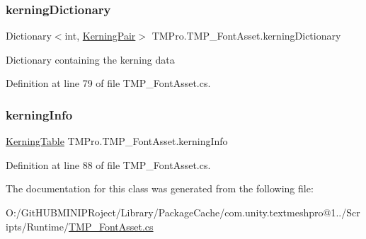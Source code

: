 \subsubsection{\texorpdfstring{kerningDictionary}{kerningDictionary}}
{\footnotesize\ttfamily Dictionary$<$int, \mbox{\hyperlink{class_t_m_pro_1_1_kerning_pair}{Kerning\+Pair}}$>$ T\+M\+Pro.\+T\+M\+P\+\_\+\+Font\+Asset.\+kerning\+Dictionary\hspace{0.3cm}{\ttfamily [get]}}



Dictionary containing the kerning data 



Definition at line 79 of file T\+M\+P\+\_\+\+Font\+Asset.\+cs.

\mbox{\label{class_t_m_pro_1_1_t_m_p___font_asset_a29e3d4b8a89e5bca2f9b8238257f4cd9}} 
\subsubsection{\texorpdfstring{kerningInfo}{kerningInfo}}
{\footnotesize\ttfamily \mbox{\hyperlink{class_t_m_pro_1_1_kerning_table}{Kerning\+Table}} T\+M\+Pro.\+T\+M\+P\+\_\+\+Font\+Asset.\+kerning\+Info\hspace{0.3cm}{\ttfamily [get]}}







Definition at line 88 of file T\+M\+P\+\_\+\+Font\+Asset.\+cs.



The documentation for this class was generated from the following file\+:\begin{DoxyCompactItemize}
\item 
O\+:/\+Git\+H\+U\+B\+M\+I\+N\+I\+P\+Roject/\+Library/\+Package\+Cache/com.\+unity.\+textmeshpro@1../\+Scripts/\+Runtime/\mbox{\hyperlink{_t_m_p___font_asset_8cs}{T\+M\+P\+\_\+\+Font\+Asset.\+cs}}\end{DoxyCompactItemize}
